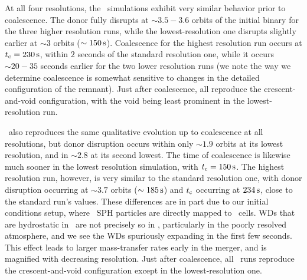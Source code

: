 At all four resolutions, the \gasoline\ simulations exhibit very similar behavior prior to coalescence.  The donor fully disrupts at $\sim3.5-3.6$ orbits of the initial binary for the three higher resolution runs, while the lowest-resolution one disrupts slightly earlier at $\sim3$ orbits ($\sim150\,\mathrm{s}$).  Coalescence for the highest resolution run occurs at $\tcoal = 230\,\mrm{s}$, within $2$ seconds of the standard resolution one, while it occurs $\sim20 - 35$ seconds earlier for the two lower resolution runs (we note the way we determine coalescence is somewhat sensitive to changes in the detailed configuration of the remnant).  Just after coalescence, all reproduce the crescent-and-void configuration, with the void being least prominent in the lowest-resolution run.  

\arepo\ also reproduces the same qualitative evolution up to coalescence at all resolutions, but donor disruption occurs within only $\sim1.9$ orbits at its lowest resolution, and in $\sim2.8$ at its second lowest.  The time of coalescence is likewise much sooner in the lowest resolution simulation, with $\tcoal = 150\,\mrm{s}$.  The highest resolution run, however, is very similar to the standard resolution one, with donor disruption occurring at $\sim3.7$ orbits ($\sim185\,\mathrm{s}$) and $\tcoal$ occurring at $234\,\mathrm{s}$, close to the standard run's values.  These differences are in part due to our initial conditions setup, where \gasoline\ SPH particles are directly mapped to \arepo\ cells.  WDs that are hydrostatic in \gasoline\ are not precisely so in \arepo, particularly in the poorly resolved atmosphere, and we see the WDs spuriously expanding in the first few seconds.  This effect leads to larger mass-transfer rates early in the merger, and is magnified with decreasing resolution.  Just after coalescence, all \arepo\ runs reproduce the crescent-and-void configuration except in the lowest-resolution one.

